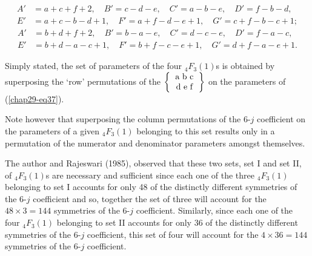 \begin{equation}
\begin{split}
A' & = a+c+f+2, \quad B'=c-d-e, \quad C'=a-b-e, \quad D'=f-b-d,\\
E' & = a+c-b-d+1, \quad F'=a+f-d-e+1, \quad G'=c+f-b-c+1; \label{chap29-eq40}
\end{split}
\end{equation}
\begin{equation}
\begin{split}
A' & = b+d+f+2, \quad B'=b-a-e, \quad C'=d-c-e, \quad D'=f-a-c,\\
E' & = b+d-a-c+1, \quad F'=b+f-c-e+1, \quad G'=d+f-a-e+1. \label{chap29-eq41}
\end{split}
\end{equation}

Simply stated, the set of parameters of the four $_4F_3(1)$s is obtained by
superposing the `row' permutations of the $\left\{ \begin{tabular} {c} a\ b\ c\\ d\ e\ f \\ \end{tabular} \right\}$ on the parameters of (\eqref{chap29-eq37}).

Note however that superposing the column permutations of the 6-$j$ coefficient
on the parameters of a given $_4F_3(1)$ belonging to this set results only in a
permutation of the numerator and denominator parameters amongst themselves.

The author and Rajeswari (1985), observed that these two sets, set I and set II,
of $_4F_3(1)$s are necessary and sufficient since each one of the three $_4F_3(1)$
belonging to set I accounts for only 48 of the distinctly different symmetries of 
the 6-$j$ coefficient and so, together the set of three will account for the 
$48\times 3 = 144$ symmetries of the 6-$j$ coefficient. Similarly, since each one of 
the four $_4F_3(1)$ belonging to set II accounts for only 36 of the distinctly 
different symmetries of the 6-$j$ coefficient, this set of four will account for 
the $4\times 36 = 144$ symmetries of the 6-$j$ coefficient.

